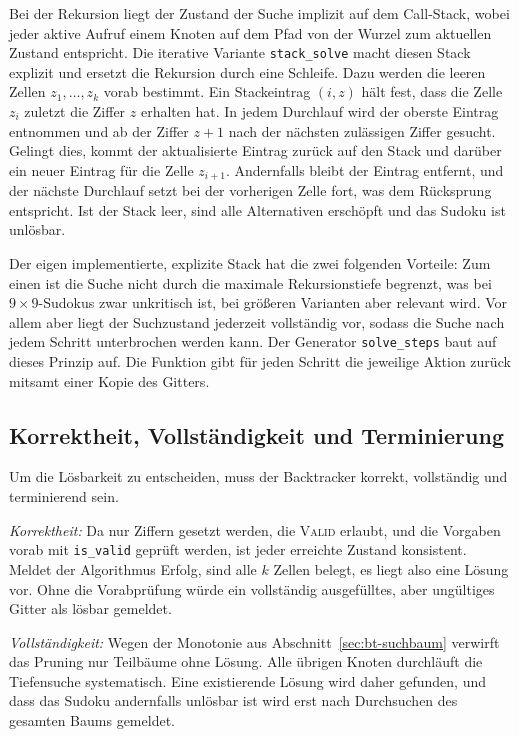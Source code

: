 Bei der Rekursion liegt der Zustand der Suche implizit auf dem Call-Stack, 
wobei jeder aktive Aufruf einem Knoten auf dem Pfad von der Wurzel zum aktuellen Zustand entspricht. 
Die iterative Variante \texttt{stack\_solve} macht diesen Stack explizit und ersetzt die Rekursion durch eine Schleife. 
Dazu werden die leeren Zellen $z_1, \dots, z_k$ vorab bestimmt. 
Ein Stackeintrag $(i, z)$ hält fest, dass die Zelle $z_i$ zuletzt die Ziffer $z$ erhalten hat. 
In jedem Durchlauf wird der oberste Eintrag entnommen und ab der Ziffer $z + 1$ nach der nächsten zulässigen Ziffer gesucht. 
Gelingt dies, kommt der aktualisierte Eintrag zurück auf den Stack und darüber ein neuer Eintrag für die Zelle $z_{i+1}$. 
Andernfalls bleibt der Eintrag entfernt, und der nächste Durchlauf setzt bei der vorherigen Zelle fort, 
was dem Rücksprung entspricht. 
Ist der Stack leer, sind alle Alternativen erschöpft und das Sudoku ist unlösbar.

Der eigen implementierte, explizite Stack hat die zwei folgenden Vorteile: 
Zum einen ist die Suche nicht durch die maximale Rekursionstiefe begrenzt, was bei $9 \times 9$-Sudokus zwar unkritisch ist, 
bei größeren Varianten aber relevant wird. 
Vor allem aber liegt der Suchzustand jederzeit vollständig vor, sodass die Suche nach jedem Schritt unterbrochen werden kann. 
Der Generator \texttt{solve\_steps} baut auf dieses Prinzip auf. 
Die Funktion gibt für jeden Schritt die jeweilige Aktion zurück mitsamt einer Kopie des Gitters. 

\subsection{Korrektheit, Vollständigkeit und Terminierung}\label{sec:bt-korrektheit}

Um die Lösbarkeit zu entscheiden, muss der Backtracker korrekt, vollständig und terminierend sein.

\emph{Korrektheit:} Da nur Ziffern gesetzt werden, die \textsc{Valid} erlaubt, 
und die Vorgaben vorab mit \texttt{is\_valid} geprüft werden, ist jeder erreichte Zustand konsistent. 
Meldet der Algorithmus Erfolg, sind alle $k$ Zellen belegt, es liegt also eine Lösung vor. 
Ohne die Vorabprüfung würde ein vollständig ausgefülltes, aber ungültiges Gitter als lösbar gemeldet.

\emph{Vollständigkeit:} Wegen der Monotonie aus Abschnitt~\ref{sec:bt-suchbaum} 
verwirft das Pruning nur Teilbäume ohne Lösung. Alle übrigen Knoten durchläuft die Tiefensuche systematisch. 
Eine existierende Lösung wird daher gefunden, 
und dass das Sudoku andernfalls unlösbar ist wird erst nach Durchsuchen des gesamten Baums gemeldet.

